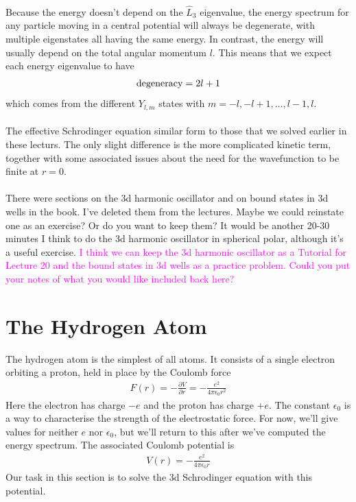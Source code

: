 \documentclass[12pt]{article}
\def\be{\begin{eqnarray}}
\def\ee{\end{eqnarray}}
\newcommand{\nn}{\nonumber}
\newcommand\para{\paragraph{}}
\newcommand{\ppp}[2]{\frac{\partial {#1}}{\partial {#2}}}
\newcommand{\co}{\color{olive}}
\newcommand{\cblue}{\color{blue}}
\newcommand{\alyssa}{\textcolor{magenta}}
\begin{document}
{\para
{\co Because the energy doesn't depend on the $\hat{L}_3$ eigenvalue,  the energy spectrum for any particle moving in a central potential will always be degenerate, with multiple eigenstates all having the same energy. In contrast, the energy will usually depend on the total angular momentum $l$. This means that we expect each energy eigenvalue to have 
%
\be {\rm degeneracy} = 2l+1\nn\ee
%
which comes from the different $Y_{l,m}$ states with $m=-l,-l+1,\ldots, l-1,l$.}


\para
The effective Schrodinger equation similar form to those that we solved earlier in these lecturs.  The only slight difference is the more complicated kinetic term, together with some associated issues about the need for the wavefunction to be finite at $r=0$. 



\para
{\cblue There were sections on the 3d harmonic oscillator and on bound states in 3d wells in the book. I've deleted them from the lectures. Maybe we could reinstate one as an exercise? Or do you want to keep them? It would be another 20-30 minutes I think to do the 3d harmonic oscillator in spherical polar, although it's a useful exercise.} \alyssa{I think we can keep the 3d harmonic oscillator as a Tutorial for Lecture 20 and the bound states in 3d wells as a practice problem. Could you put your notes of what you would like included back here?}



\newpage
\section{The Hydrogen Atom}

The hydrogen atom is the simplest of all atoms. {\co It consists of a single electron orbiting a proton, held in place by the Coulomb force
%
\be F(r) = -\ppp{V}{r}= -\frac{e^2}{4\pi \epsilon_0r^2}\nn\ee
%
Here the electron has charge $-e$ and the proton has charge $+e$. The constant $\epsilon_0$ is a way to characterise the strength of the electrostatic force.} For now, we'll give values for neither  $e$ nor $\epsilon_0$, but we'll return to this after we've computed the energy spectrum.  {\co The associated Coulomb potential is 
%
\be V(r) = -\frac{e^2}{4\pi\epsilon_0 r}\nn\ee
%
}
Our task in this section is to solve the 3d Schrodinger equation with this potential.

}
\end{document}

